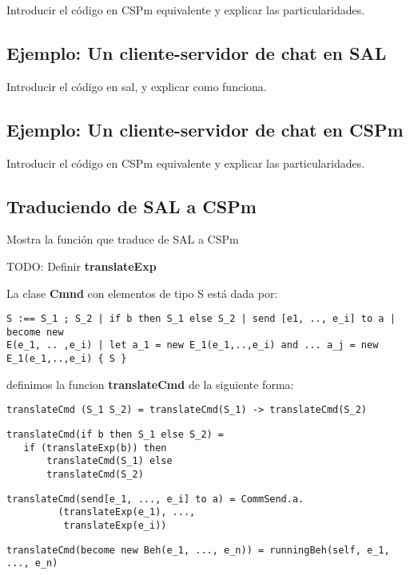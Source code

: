 \documentclass[fleqn]{article}
\begin{document}
Introducir el código en CSPm equivalente y explicar las particularidades.

\subsection{Ejemplo: Un cliente-servidor de chat en SAL}

Introducir el código en sal, y explicar como funciona.

\subsection{Ejemplo: Un cliente-servidor de chat en CSPm}

Introducir el código en CSPm equivalente y explicar las particularidades.

\subsection{Traduciendo de SAL a CSPm}

Mostra la función que traduce de SAL a CSPm



TODO: Definir \textbf{translateExp}

La clase \textbf{Cmnd} con elementos de tipo S está dada por:

\begin{verbatim}
S :== S_1 ; S_2 | if b then S_1 else S_2 | send [e1, .., e_i] to a | become new
E(e_1, .. ,e_i) | let a_1 = new E_1(e_1,..,e_i) and ... a_j = new
E_1(e_1,..,e_i) { S } 
\end{verbatim}

definimos la funcion \textbf{translateCmd} de la siguiente forma:

\begin{verbatim}
translateCmd (S_1 S_2) = translateCmd(S_1) -> translateCmd(S_2)
\end{verbatim}


\begin{verbatim}
translateCmd(if b then S_1 else S_2) = 
   if (translateExp(b)) then
       translateCmd(S_1) else 
       translateCmd(S_2)
\end{verbatim}

\begin{verbatim}
translateCmd(send[e_1, ..., e_i] to a) = CommSend.a.
         (translateExp(e_1), ..., 
          translateExp(e_i)) 
\end{verbatim}

\begin{verbatim}
translateCmd(become new Beh(e_1, ..., e_n)) = runningBeh(self, e_1, ..., e_n)
\end{verbatim}
\end{document}

